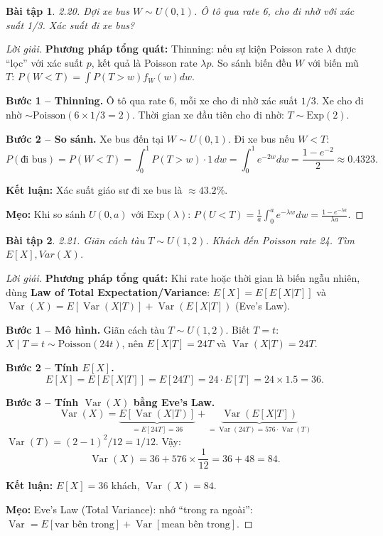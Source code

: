 \documentclass[8pt,a4paper]{article}
\newtheorem{exercise}{Bài tập}
\newenvironment{solution}{\begin{proof}[Lời giải]}{\end{proof}}
\newcommand{\Var}{\operatorname{Var}}
\begin{document}
\begin{exercise}
2.20. Đợi xe bus $W \sim U(0,1)$. Ô tô qua rate 6, cho đi nhờ với xác suất 1/3. Xác suất đi xe bus?
\end{exercise}
\begin{solution}
\textbf{Phương pháp tổng quát:} Thinning: nếu sự kiện Poisson rate $\lambda$ được ``lọc'' với xác suất $p$, kết quả là Poisson rate $\lambda p$. So sánh biến đều $W$ với biến mũ $T$: $P(W < T) = \int P(T > w) f_W(w) dw$.

\textbf{Bước 1 -- Thinning.} Ô tô qua rate 6, mỗi xe cho đi nhờ xác suất $1/3$. Xe cho đi nhờ $\sim \text{Poisson}(6 \times 1/3 = 2)$. Thời gian xe đầu tiên cho đi nhờ: $T \sim \text{Exp}(2)$.

\textbf{Bước 2 -- So sánh.} Xe bus đến tại $W \sim U(0, 1)$. Đi xe bus nếu $W < T$:
\[
  P(\text{đi bus}) = P(W < T) = \int_0^1 P(T > w) \cdot 1 \, dw = \int_0^1 e^{-2w} dw = \frac{1-e^{-2}}{2} \approx \boxed{0.4323}.
\]

\textbf{Kết luận:} Xác suất giáo sư đi xe bus là $\approx 43.2\%$.

\textbf{Mẹo:} Khi so sánh $U(0,a)$ với $\text{Exp}(\lambda)$: $P(U < T) = \frac{1}{a}\int_0^a e^{-\lambda w} dw = \frac{1-e^{-\lambda a}}{\lambda a}$.
\end{solution}

\begin{exercise}
2.21. Giãn cách tàu $T \sim U(1,2)$. Khách đến Poisson rate 24. Tìm $E[X], Var(X)$.
\end{exercise}
\begin{solution}
\textbf{Phương pháp tổng quát:} Khi rate hoặc thời gian là biến ngẫu nhiên, dùng \textbf{Law of Total Expectation/Variance}:
$E[X] = E[E[X|T]]$ và $\Var(X) = E[\Var(X|T)] + \Var(E[X|T])$ (Eve's Law).

\textbf{Bước 1 -- Mô hình.} Giãn cách tàu $T \sim U(1,2)$. Biết $T=t$: $X \mid T=t \sim \text{Poisson}(24t)$, nên $E[X|T] = 24T$ và $\Var(X|T) = 24T$.

\textbf{Bước 2 -- Tính $E[X]$.}
\[
  E[X] = E[E[X|T]] = E[24T] = 24 \cdot E[T] = 24 \times 1.5 = \boxed{36}.
\]

\textbf{Bước 3 -- Tính $\Var(X)$ bằng Eve's Law.}
\[
  \Var(X) = \underbrace{E[\Var(X|T)]}_{= E[24T] = 36} + \underbrace{\Var(E[X|T])}_{= \Var(24T) = 576 \cdot \Var(T)}
\]
$\Var(T) = (2-1)^2/12 = 1/12$. Vậy:
\[
  \Var(X) = 36 + 576 \times \frac{1}{12} = 36 + 48 = \boxed{84}.
\]

\textbf{Kết luận:} $E[X] = 36$ khách, $\Var(X) = 84$.

\textbf{Mẹo:} Eve's Law (Total Variance): nhớ ``trong ra ngoài'': $\Var = E[\text{var bên trong}] + \Var[\text{mean bên trong}]$.
\end{solution}
\end{document}
